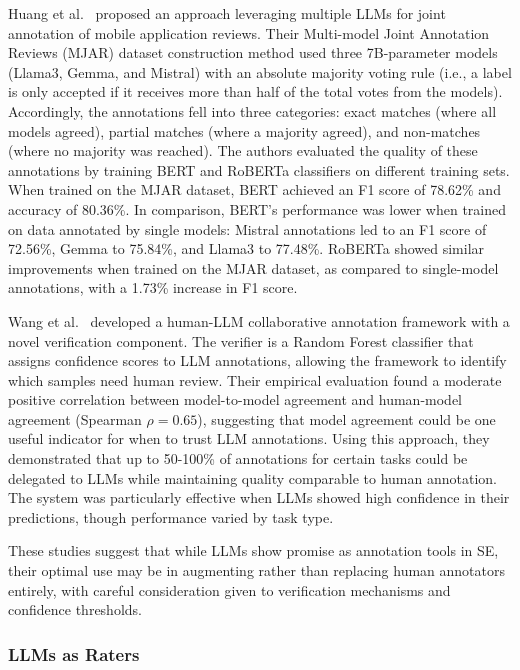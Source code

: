 \documentclass[11pt]{article}
\begin{document}
Huang et al.~\cite{Huang2023Enhancing} proposed an approach leveraging multiple LLMs for joint annotation of mobile application reviews. 
Their Multi-model Joint Annotation Reviews (MJAR) dataset construction method used three 7B-parameter models (Llama3, Gemma, and Mistral) with an absolute majority voting rule (i.e., a label is only accepted if it receives more than half of the total votes from the models). 
Accordingly, the annotations fell into three categories: exact matches (where all models agreed), partial matches (where a majority agreed), and non-matches (where no majority was reached). 
The authors evaluated the quality of these annotations by training BERT and RoBERTa classifiers on different training sets. 
When trained on the MJAR dataset, BERT achieved an F1 score of 78.62\% and accuracy of 80.36\%. 
In comparison, BERT's performance was lower when trained on data annotated by single models: Mistral annotations led to an F1 score of 72.56\%, Gemma to 75.84\%, and Llama3 to 77.48\%.
RoBERTa showed similar improvements when trained on the MJAR dataset, as compared to single-model annotations, with a 1.73\% increase in F1 score.

Wang et al.~\cite{DBLP:conf/chi/Wang0RMM24} developed a human-LLM collaborative annotation framework with a novel verification component. 
The verifier is a Random Forest classifier that assigns confidence scores to LLM annotations, allowing the framework to identify which samples need human review. 
Their empirical evaluation found a moderate positive correlation between model-to-model agreement and human-model agreement (Spearman $\rho = 0.65$), suggesting that model agreement could be one useful indicator for when to trust LLM annotations.
Using this approach, they demonstrated that up to 50-100\% of annotations for certain tasks could be delegated to LLMs while maintaining quality comparable to human annotation. 
The system was particularly effective when LLMs showed high confidence in their predictions, though performance varied by task type.

These studies suggest that while LLMs show promise as annotation tools in SE, their optimal use may be in augmenting rather than replacing human annotators entirely, with careful consideration given to verification mechanisms and confidence thresholds.

\subsubsection{LLMs as Raters}
\end{document}
